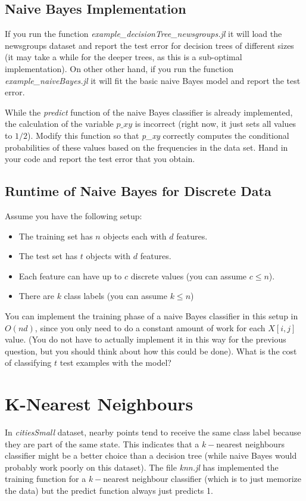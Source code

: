 \documentclass{article}
\def\blu#1{{\color{blu}#1}}
\def\items#1{\begin{itemize}#1\end{itemize}}
\begin{document}
\subsection{Naive Bayes Implementation}

If you run the function \emph{example\_decisionTree\_newsgroups.jl} it will load the newsgroups dataset and report the test error for decision trees of different sizes (it may take a while for the deeper trees, as this is a sub-optimal implementation). On other other hand, if you run the function \emph{example\_naiveBayes.jl} it will fit the basic naive Bayes model and report the test error.

While the \emph{predict} function of the naive Bayes classifier is already implemented, the calculation of the variable $p\_xy$ is incorrect (right now, it just sets all values to $1/2$). \blu{Modify this function so that \emph{p\_xy} correctly computes the conditional probabilities of these values based on the frequencies in the data set. Hand in your code and report the test error that you obtain.}


\subsection{Runtime of Naive Bayes for Discrete Data}

Assume you have the following setup:
\items{
\item The training set has $n$ objects each with $d$ features.
\item The test set has $t$ objects with $d$ features.
\item Each feature can have up to $c$ discrete values (you can assume $c \leq n$).
\item There are $k$ class labels (you can assume $k \leq n$)
}
You can implement the training phase of a naive Bayes classifier in this setup in $O(nd)$, since you only need to do a constant amount of work for each $X[i,j]$ value. (You do not have to actually implement it in this way for the previous question, but you should think about how this could be done). \blu{What is the cost of classifying $t$ test examples with the model?}




\section{K-Nearest Neighbours}


In \emph{citiesSmall} dataset, nearby points tend to receive the same class label because they are part of the same state. This indicates that a $k-$nearest neighbours classifier might be a better choice than a decision tree (while naive Bayes would probably work poorly on this dataset). The file \emph{knn.jl} has implemented the training function for a $k-$nearest neighbour classifier (which is to just memorize the data) but the predict function always just predicts 1.
\end{document}
